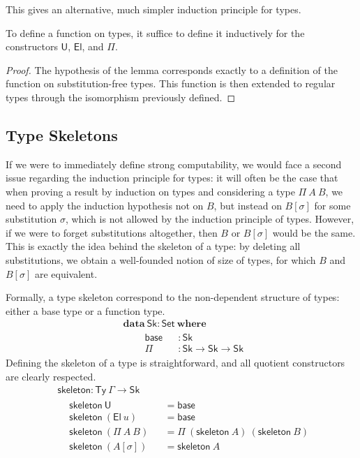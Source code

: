\documentclass[a4paper,UKenglish,cleveref]{lipics-v2019}
\newcommand{\agdaSymb}[1]{\mathsf{#1}}
\newcommand{\agdaKW}[1]{\mathbf{#1}}
\newcommand{\ind}{\hspace{1em}}
\newcommand{\data}{\agdaKW{data}}
\newcommand{\where}{\agdaKW{where}}
\newcommand{\Set}{\agdaSymb{Set}}
\newcommand{\Ty}{\agdaSymb{Ty}}
\newcommand{\U}{\agdaSymb{U}}
\newcommand{\El}{\agdaSymb{El}}
\newcommand{\Sk}{\agdaSymb{Sk}}
\newcommand{\base}{\agdaSymb{base}}
\newcommand{\skel}{\agdaSymb{skeleton}}
\begin{document}
This gives an alternative, much simpler induction principle for types.
\begin{lemma}
  \label{lem:typeInduction}
  To define a function on types, it suffice to define it inductively for the
  constructors $\U$, $\El$, and $\Pi$.
\end{lemma}
\begin{proof}
  The hypothesis of the lemma corresponds exactly to a definition of the
  function on substitution-free types. This function is then extended to regular
  types through the isomorphism previously defined.
\end{proof}

\subsection{Type Skeletons}
If we were to immediately define strong computability, we would face a second
issue regarding the induction principle for types: it will often be the case
that when proving a result by induction on types and considering a type
$\Pi\ A\ B$, we need to apply the induction hypothesis not on $B$, but instead
on $B[\sigma]$ for some substitution $\sigma$, which is not allowed by the
induction principle of types. However, if we were to forget substitutions
altogether, then $B$ or $B[\sigma]$ would be the same. This is exactly the idea
behind the skeleton of a type: by deleting all substitutions, we obtain a
well-founded notion of size of types, for which $B$ and $B[\sigma]$ are equivalent.

Formally, a type skeleton correspond to the non-dependent structure of types:
either a base type or a function type.
\begin{align*}
  & \data\ \Sk : \Set\ \where \\ & \ind
  \begin{alignedat}{2}
    & \base && : \Sk \\
    & \Pi && : \Sk \to \Sk \to \Sk
  \end{alignedat}
\end{align*}
Defining the skeleton of a type is straightforward, and all quotient
constructors are clearly respected.
\begin{align*}
  & \skel : \Ty\ \Gamma \to \Sk \\ &
  \begin{alignedat}{2}
    & \skel\ \U && = \base \\
    & \skel\ (\El\ u) && = \base \\
    & \skel\ (\Pi\ A\ B) && = \Pi\ (\skel\ A)\ (\skel\ B) \\
    & \skel\ (A[\sigma]) && = \skel\ A
  \end{alignedat}
\end{align*}
\end{document}
